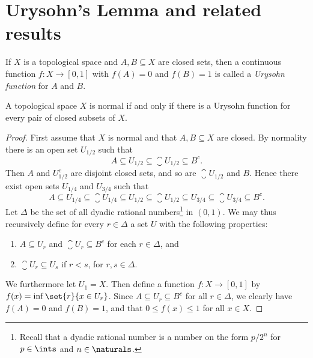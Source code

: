\documentclass[article, a4paper, 11pt, oneside]{memoir}
\numberwithin{equation}{chapter}
\begin{document}
\section{Urysohn's Lemma and related results}

If $X$ is a topological space and $A,B \subseteq X$ are closed sets, then a continuous function $f \colon X \to [0,1]$ with $f(A) = 0$ and $f(B) = 1$ is called a \emph{Urysohn function} for $A$ and $B$.

\begin{theorem}
    A topological space $X$ is normal if and only if there is a Urysohn function for every pair of closed subsets of $X$.
\end{theorem}

\begin{proof}
    First assume that $X$ is normal and that $A,B \subseteq X$ are closed. By normality there is an open set $U_{1/2}$ such that
    \begin{equation*}
        A
            \subseteq U_{1/2}
            \subseteq \closure{U}_{\!1/2}
            \subseteq B^c.
    \end{equation*}
    Then $A$ and $U_{1/2}^c$ are disjoint closed sets, and so are $\closure{U}_{\!1/2}$ and $B$. Hence there exist open sets $U_{1/4}$ and $U_{3/4}$ such that
    \begin{equation*}
        A
            \subseteq U_{1/4}
            \subseteq \closure{U}_{\!1/4}
            \subseteq U_{1/2}
            \subseteq \closure{U}_{\!1/2}
            \subseteq U_{3/4}
            \subseteq \closure{U}_{\!3/4}
            \subseteq B^c.
    \end{equation*}
    Let $\Delta$ be the set of all dyadic rational numbers\footnote{Recall that a dyadic rational number is a number on the form $p/2^n$ for $p \in \ints$ and $n \in \naturals$.} in $(0,1)$. We may thus recursively define for every $r \in \Delta$ a set $U$ with the following properties:
    \begin{enumerate} %
        \item $A \subseteq U_r$ and $\closure{U}_{\!r} \subseteq B^c$ for each $r \in \Delta$, and

        \item \label{enum:Urysohn-proof-closure-inside-open} $\closure{U}_{\!r} \subseteq U_s$ if $r < s$, for $r,s \in \Delta$.
    \end{enumerate}
    We furthermore let $U_1 = X$. Then define a function $f \colon X \to [0,1]$ by $f(x) = \inf \set{r}{x \in U_r}$. Since $A \subseteq U_r \subseteq B^c$ for all $r \in \Delta$, we clearly have $f(A) = 0$ and $f(B) = 1$, and that $0 \leq f(x) \leq 1$ for all $x \in X$.


\end{proof}
\end{document}
